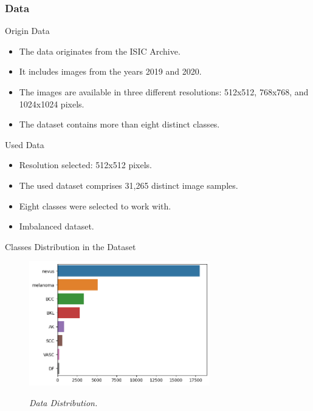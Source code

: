 \documentclass[dvipsnames,mathserif]{beamer}
\begin{document}
{    \begin{frame}
      \frametitle{Data}
    \end{frame}

    \begin{frame}

      \large Origin Data
      \vspace{0.25cm}

      \footnotesize

      \begin{itemize}
        \item The data originates from the ISIC Archive.
        \item It includes images from the years 2019 and 2020.
        \item The images are available in three different resolutions: 512x512,
          768x768, and 1024x1024 pixels.
        \item The dataset contains more than eight distinct classes.
      \end{itemize}

    \end{frame}


    \begin{frame}

      \large Used Data
      \vspace{0.25cm}

      \footnotesize

      \begin{itemize}
        \item Resolution selected: 512x512 pixels.
        \item The used dataset comprises 31,265 distinct image samples.
        \item Eight classes were selected to work with.
        \item Imbalanced dataset.
      \end{itemize}

    \end{frame}

    \begin{frame}

      \large Classes Distribution in the Dataset
      \vspace{0.25cm}

      \begin{figure}[H]
        \centering
        \includegraphics[width=0.7\textwidth]{images/hole-dataset-diagnosis.png}
        \caption[Data Distribution]{\textit{Data Distribution. }}
        {\label{fig:hole-dataset-distribution}}
      \end{figure}


\end{frame}}
\end{document}
